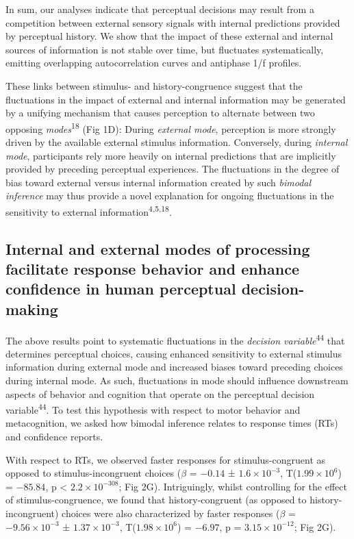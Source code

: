 \documentclass[
]{article}
\begin{document}
In sum, our analyses indicate that perceptual decisions may result from
a competition between external sensory signals with internal predictions
provided by perceptual history. We show that the impact of these
external and internal sources of information is not stable over time,
but fluctuates systematically, emitting overlapping autocorrelation
curves and antiphase 1/f profiles.

These links between stimulus- and history-congruence suggest that the
fluctuations in the impact of external and internal information may be
generated by a unifying mechanism that causes perception to alternate
between two opposing \emph{modes}\textsuperscript{18} (Fig 1D):
During \emph{external mode}, perception is more strongly driven by the
available external stimulus information. Conversely, during
\emph{internal mode}, participants rely more heavily on internal
predictions that are implicitly provided by preceding perceptual
experiences. The fluctuations in the degree of bias toward external
versus internal information created by such \emph{bimodal inference} may
thus provide a novel explanation for ongoing fluctuations in the
sensitivity to external information\textsuperscript{4,5,18}.

\hypertarget{internal-and-external-modes-of-processing-facilitate-response-behavior-and-enhance-confidence-in-human-perceptual-decision-making}{%
\subsection{Internal and external modes of processing facilitate
response behavior and enhance confidence in human perceptual
decision-making}\label{internal-and-external-modes-of-processing-facilitate-response-behavior-and-enhance-confidence-in-human-perceptual-decision-making}}

The above results point to systematic fluctuations in the \emph{decision
variable}\textsuperscript{44} that determines perceptual choices,
causing enhanced sensitivity to external stimulus information during
external mode and increased biases toward preceding choices during
internal mode. As such, fluctuations in mode should influence downstream
aspects of behavior and cognition that operate on the perceptual
decision variable\textsuperscript{44}. To test this hypothesis with
respect to motor behavior and metacognition, we asked how bimodal
inference relates to response times (RTs) and confidence reports.

With respect to RTs, we observed faster responses for stimulus-congruent
as opposed to stimulus-incongruent choices (\(\beta\) = \(-0.14\) ±
\(\ensuremath{1.6\times 10^{-3}}\),
T(\(\ensuremath{1.99\times 10^{6}}\)) = \(-85.84\), p < \(\ensuremath{2.2\times 10^{-308}}\); Fig
2G). Intriguingly, whilst controlling for the effect of
stimulus-congruence, we found that history-congruent (as opposed to
history-incongruent) choices were also characterized by faster responses
(\(\beta\) = \(\ensuremath{-9.56\times 10^{-3}}\) ±
\(\ensuremath{1.37\times 10^{-3}}\),
T(\(\ensuremath{1.98\times 10^{6}}\)) = \(-6.97\), p =
\(\ensuremath{3.15\times 10^{-12}}\); Fig 2G).
\end{document}
